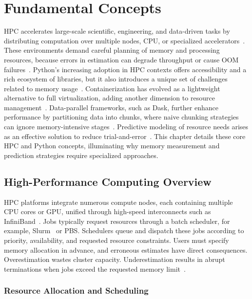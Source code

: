 \chapter{Fundamental Concepts}
\label{ch:fundamental-concepts}

\ac{HPC} accelerates large-scale scientific, engineering, and data-driven tasks by distributing computation over multiple nodes, \ac{CPU}, or specialized accelerators~\cite{yoo2003slurm,Snir1998MPI,Dagum1998OpenMP}.
These environments demand careful planning of memory and processing resources, because errors in estimation can degrade throughput or cause \ac{OOM} failures~\cite{Bader2023}.
Python's increasing adoption in \ac{HPC} contexts offers accessibility and a rich ecosystem of libraries, but it also introduces a unique set of challenges related to memory usage~\cite{Nanjekye2023}.
Containerization has evolved as a lightweight alternative to full virtualization, adding another dimension to resource management~\cite{Boettiger2015,Kurtzer2017}.
Data-parallel frameworks, such as Dask, further enhance performance by partitioning data into chunks, where naive chunking strategies can ignore memory-intensive stages~\cite{rocklin2015dask}.
Predictive modeling of resource needs arises as an effective solution to reduce trial-and-error~\cite{Bader2023,Bader2024}.
This chapter details these core \ac{HPC} and Python concepts, illuminating why memory measurement and prediction strategies require specialized approaches.


\section{High-Performance Computing Overview}
\label{sec:fundamentals-hpc-overview}

\ac{HPC} platforms integrate numerous compute nodes, each containing multiple \ac{CPU} cores or \ac{GPU}, unified through high-speed interconnects such as InfiniBand~\cite{infiniband-ta-2015}.
Jobs typically request resources through a batch scheduler, for example, Slurm~\cite{yoo2003slurm} or \ac{PBS}\cite{yoo2003slurm}.
Schedulers queue and dispatch these jobs according to priority, availability, and requested resource constraints.
Users must specify memory allocation in advance, and erroneous estimates have direct consequences.
Overestimation wastes cluster capacity.
Underestimation results in abrupt terminations when jobs exceed the requested memory limit~\cite{Bader2023,Bader2024}.

\subsection{Resource Allocation and Scheduling}
\label{subsec:fundamentals-resource-allocation}

